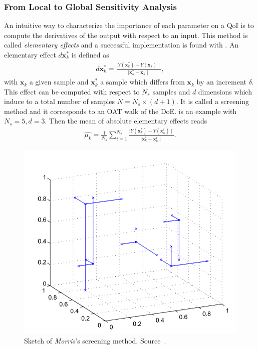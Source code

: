 \subsubsection{From Local to Global Sensitivity Analysis}

An intuitive way to characterize the importance of each parameter on a QoI is to compute the derivatives of the output with respect to an input. This method is called \emph{elementary effects} and a successful implementation is found with \citet{morris1991}. An elementary effect $d\mathbf{x}_{k}^*$ is defined as
\begin{align}
d\mathbf{x}_{k}^* = \frac{ \mid Y(\mathbf{x}_{k}^*) -  Y(\mathbf{x}_{k}) \mid}{\mid \mathbf{x}_{k}^* - \mathbf{x}_{k}  \mid},
\end{align}
\noindent with $\mathbf{x}_{k}$ a given sample and $\mathbf{x}_{k}^*$ a sample which differs from $\mathbf{x}_{k}$ by an increment $\delta$. This effect can be computed with respect to $N_s$ samples and $d$ dimensions which induce to a total number of samples $N = N_s\times(d + 1)$. It is called a screening method and it corresponds to an OAT walk of the DoE.  is an example with $N_s = 5, d = 3$. Then the mean of absolute elementary effects reads
\begin{align}
\hat{\mu_k} = \frac{1}{N_s} \sum_{i=1}^{N_s} \frac{ \mid Y(\mathbf{x}_{k}^*) -  Y(\mathbf{x}_{k}^i) \mid}{\mid \mathbf{x}_{k}^* - \mathbf{x}_{k}^i  \mid}.
\end{align}

\begin{figure}[!ht]
\centering
\includegraphics[width=0.8\linewidth,keepaspectratio]{fig/literature/morris.png}
\caption{Sketch of \emph{Morris}'s screening method. Source~\cite{Becker2018}.}
\label{fig:morris}
\end{figure}


